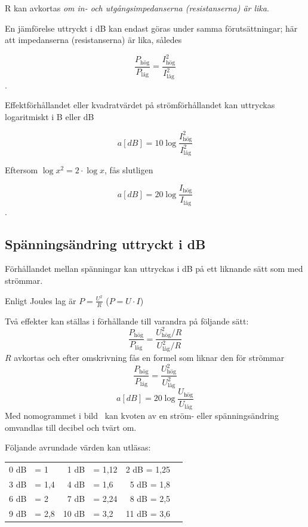 R kan avkortas \emph{om in- och utgångsimpedanserna (resistanserna) är lika}.

En jämförelse uttryckt i dB kan endast göras under samma förutsättningar;
här att impedanserna (resistanserna) är lika, således

\[\dfrac{P_{\text{hög}}}{P_{\text{låg}}} = \dfrac{I_{\text{hög}}^2}{I_{\text{låg}}^2}\].

Effektförhållandet eller kvadratvärdet på strömförhållandet kan uttryckas
logaritmiskt i B eller dB

\[a[dB] = 10\log \dfrac{I_{\text{hög}}^2}{I_{\text{låg}}^2}\]

Eftersom \(\log x^2 = 2 \cdot \log x\), fås slutligen

\[a[dB] = 20\log \dfrac{I_{\text{hög}}}{I_{\text{låg}}}\].

\subsection{Spänningsändring uttryckt i dB}

Förhållandet mellan spänningar kan uttryckas i dB på ett liknande sätt som med
strömmar.

Enligt Joules lag är \(P = \frac{U^2}{R}\) (\(P = U \cdot I\))

Två effekter kan ställas i förhållande till varandra på följande sätt:
\[\dfrac{P_{\text{hög}}}{P_{\text{låg}}}=\dfrac{U_{\text{hög}}^2/R}{U_{\text{låg}}^2/R}\]
\(R\) avkortas och efter omskrivning fås en formel som liknar den för strömmar
\[\dfrac{P_{\text{hög}}}{P_{\text{låg}}} = \dfrac{U_{\text{hög}}^2}{U_{\text{låg}}^2}\]
\[a[dB] = 20\log \dfrac{U_{\text{hög}}}{U_{\text{låg}}}\]
Med nomogrammet i bild~ kan kvoten av en
ström- eller spänningsändring omvandlas till decibel och tvärt om.


Följande avrundade värden kan utläsas:

\begin{center}
\begin{tabular}{rlrlrl}
0 dB & = 1   &  1 dB & = 1,12 &  2 dB = 1,25 \\
3 dB & = 1,4 &  4 dB & = 1,6  &  5 dB = 1,8 \\
6 dB & = 2   &  7 dB & = 2,24 &  8 dB = 2,5 \\
9 dB & = 2,8 & 10 dB & = 3,2  & 11 dB = 3,6
\end{tabular}
\end{center}

